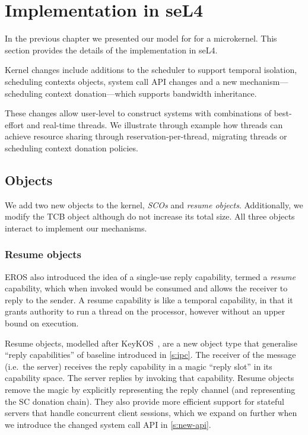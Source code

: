\chapter{Implementation in seL4}
\label{chap:implementation}


In the previous chapter we presented our model for  for a microkernel.
This section provides the details of the implementation in seL4.


Kernel changes include additions to the scheduler to support temporal isolation, scheduling contexts
objects, system call API changes and a new mechanism---scheduling context donation---which supports bandwidth inheritance.

These changes allow user-level to construct systems with combinations of best-effort and real-time threads.
We illustrate through example how threads can achieve resource sharing through reservation-per-thread, migrating threads or scheduling context donation policies.



\section{Objects}

We add two new objects to the kernel, \emph{\glspl{SCO}} and \emph{resume objects}. Additionally, we modify
the \gls{TCB} object although do not increase its total size. All three objects interact to
implement our mechanisms.

\subsection{Resume objects}
\label{s:resume}
EROS also introduced the
idea of a single-use reply capability, termed a \emph{resume} capability, which when invoked would
be consumed and allows the receiver to reply to the sender. A resume capability is like a temporal
capability, in that it grants authority to run a thread on the processor, however without an 
upper bound on execution.

Resume objects, modelled after KeyKOS~\citep{Bomberger_FFHLS_92}, are
a new object type that generalise
``reply capabilities'' of baseline \selfour introduced in \cref{s:ipc}.
The receiver of the message (i.e.\ the
server) receives the reply capability in a magic ``reply slot'' in its
capability space. The server replies by invoking that
capability. Resume objects remove the magic by explicitly representing
the reply channel (and representing the SC donation chain). They also
provide more efficient support for stateful servers that handle
concurrent client sessions, which we expand on further when we introduce the changed system call \gls{API} in \cref{s:new-api}.

